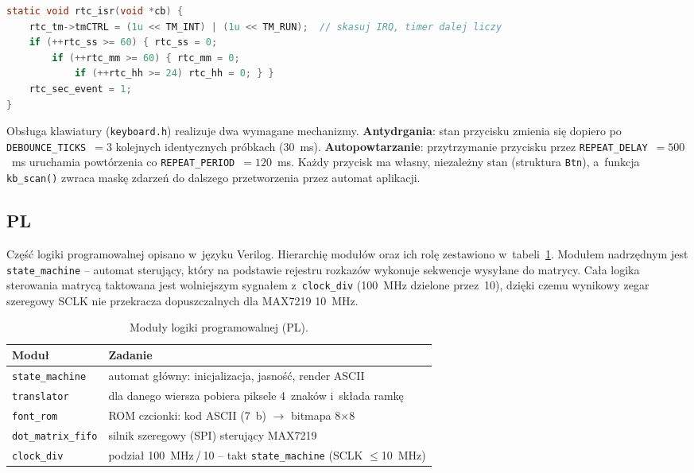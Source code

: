 \documentclass[12pt,a4paper]{article}
\begin{document}
\begin{lstlisting}[language=C, caption={Procedura obsługi przerwania RTC (\texttt{rtc.h}).}, label={lst:rtc}]
static void rtc_isr(void *cb) {
    rtc_tm->tmCTRL = (1u << TM_INT) | (1u << TM_RUN);  // skasuj IRQ, timer dalej liczy
    if (++rtc_ss >= 60) { rtc_ss = 0;
        if (++rtc_mm >= 60) { rtc_mm = 0;
            if (++rtc_hh >= 24) rtc_hh = 0; } }
    rtc_sec_event = 1;
}
\end{lstlisting}

Obsługa klawiatury (\texttt{keyboard.h}) realizuje dwa wymagane mechanizmy.
\textbf{Antydrgania}: stan przycisku zmienia się dopiero po
\texttt{DEBOUNCE\_TICKS}~$=3$ kolejnych identycznych próbkach (30~ms).
\textbf{Autopowtarzanie}: przytrzymanie przycisku przez
\texttt{REPEAT\_DELAY}~$=500$~ms uruchamia powtórzenia co
\texttt{REPEAT\_PERIOD}~$=120$~ms. Każdy przycisk ma własny, niezależny stan
(struktura \texttt{Btn}), a~funkcja \texttt{kb\_scan()} zwraca maskę zdarzeń
do dalszego przetworzenia przez automat aplikacji.

\subsection{PL}

Część logiki programowalnej opisano w~języku Verilog. Hierarchię modułów oraz
ich rolę zestawiono w~tabeli~\ref{tab:pl}. Modułem nadrzędnym jest
\texttt{state\_machine} -- automat sterujący, który na podstawie rejestru
rozkazów wykonuje sekwencje wysyłane do matrycy. Cała logika sterowania matrycą
taktowana jest wolniejszym sygnałem z~\texttt{clock\_div} (100~MHz dzielone
przez~10), dzięki czemu wynikowy zegar szeregowy SCLK nie przekracza
dopuszczalnych dla MAX7219 10~MHz.

\begin{table}[H]
\centering
\caption{Moduły logiki programowalnej (PL).}
\label{tab:pl}
\small
\begin{tabularx}{\textwidth}{@{}l X@{}}
\toprule
\textbf{Moduł} & \textbf{Zadanie} \\
\midrule
\texttt{state\_machine} & automat główny: inicjalizacja, jasność, render ASCII \\
\texttt{translator} & dla danego wiersza pobiera piksele 4~znaków i~składa ramkę \\
\texttt{font\_rom}  & ROM czcionki: kod ASCII (7~b) $\rightarrow$ bitmapa 8$\times$8 \\
\texttt{dot\_matrix\_fifo} & silnik szeregowy (SPI) sterujący MAX7219 \\
\texttt{clock\_div} & podział 100~MHz\,/\,10 -- takt \texttt{state\_machine} (SCLK $\le$10~MHz) \\
\bottomrule
\end{tabularx}
\end{table}
\end{document}
